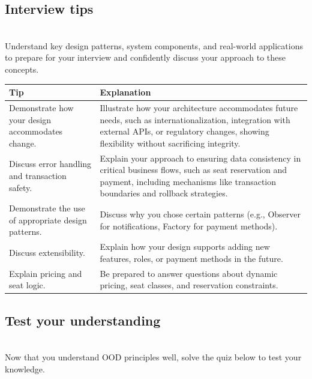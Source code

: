 \subsection{Interview tips}\label{PEA0Hs-8YCap_JRqJtlJJ}
\\
Understand key design patterns, system components, and real-world applications to prepare for your interview and confidently discuss your approach to these concepts.

\begin{tabular}{|>{\raggedright\arraybackslash}p{5cm}|>{\raggedright\arraybackslash}p{10cm}|}
\hline
\textbf{Tip} & \textbf{Explanation} \\
\hline
Demonstrate how your design accommodates change. & Illustrate how your architecture accommodates future needs, such as internationalization, integration with external APIs, or regulatory changes, showing flexibility without sacrificing integrity. \\
\hline
Discuss error handling and transaction safety. & Explain your approach to ensuring data consistency in critical business flows, such as seat reservation and payment, including mechanisms like transaction boundaries and rollback strategies. \\
\hline
Demonstrate the use of appropriate design patterns. & Discuss why you chose certain patterns (e.g., Observer for notifications, Factory for payment methods). \\
\hline
Discuss extensibility. & Explain how your design supports adding new features, roles, or payment methods in the future. \\
\hline
Explain pricing and seat logic. & Be prepared to answer questions about dynamic pricing, seat classes, and reservation constraints. \\
\hline
\end{tabular}

\subsection{Test your understanding}\label{xMxFY_uVFkK-nsTjEBLOK}
\\
Now that you understand OOD principles well, solve the quiz below to test your knowledge.

